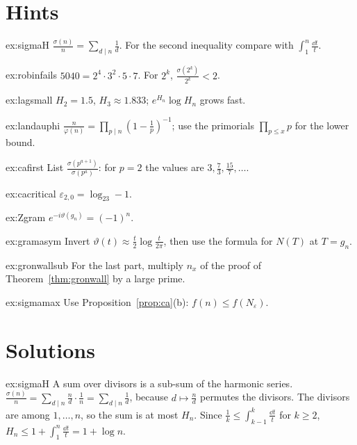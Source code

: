 \section{Hints}

\begin{hint}{ex:sigmaH}
$\frac{\sigma(n)}n=\sum_{d\mid n}\frac1d$. For the second inequality compare with $\int_1^n\frac{\dd t}t$.
\end{hint}
\begin{hint}{ex:robinfails}
$5040=2^4\cdot3^2\cdot5\cdot7$. For $2^k$, $\frac{\sigma(2^k)}{2^k}<2$.
\end{hint}
\begin{hint}{ex:lagsmall}
$H_2=1.5$, $H_3\approx1.833$; $e^{H_n}\log H_n$ grows fast.
\end{hint}
\begin{hint}{ex:landauphi}
$\frac n{\varphi(n)}=\prod_{p\mid n}(1-\frac1p)^{-1}$; use the primorials $\prod_{p\le x}p$ for the lower bound.
\end{hint}
\begin{hint}{ex:cafirst}
List $\frac{\sigma(p^{a+1})}{\sigma(p^a)}$: for $p=2$ the values are $3,\frac73,\frac{15}7,\dots$.
\end{hint}
\begin{hint}{ex:cacritical}
$\varepsilon_{2,0}=\log_23-1$.
\end{hint}
\begin{hint}{ex:Zgram}
$e^{-i\vartheta(g_n)}=(-1)^n$.
\end{hint}
\begin{hint}{ex:gramasym}
Invert $\vartheta(t)\approx\frac t2\log\frac t{2\pi}$, then use the formula for $N(T)$ at $T=g_n$.
\end{hint}
\begin{hint}{ex:gronwallsub}
For the last part, multiply $n_x$ of the proof of Theorem~\ref{thm:gronwall} by a large prime.
\end{hint}
\begin{hint}{ex:sigmamax}
Use Proposition~\ref{prop:ca}(b): $f(n)\le f(N_\varepsilon)$.
\end{hint}

\section{Solutions}

\begin{solution}{ex:sigmaH}
\idea A sum over divisors is a sub-sum of the harmonic series.
\writeup $\frac{\sigma(n)}n=\sum_{d\mid n}\frac nd\cdot\frac1n=\sum_{d\mid n}\frac1d$, because $d\mapsto\frac nd$ permutes the divisors. The divisors are among
$1,\dots,n$, so the sum is at most $H_n$. Since $\frac1k\le\int_{k-1}^k\frac{\dd t}t$ for $k\ge2$, $H_n\le1+\int_1^n\frac{\dd t}t=1+\log n$.
\end{solution}

